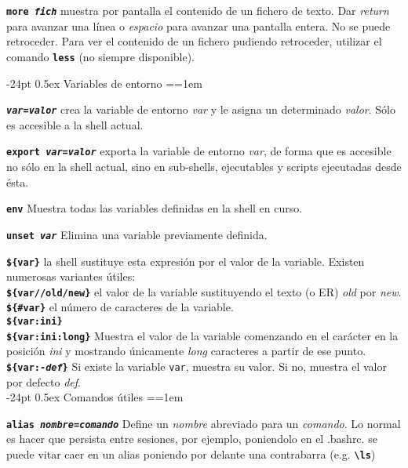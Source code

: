 \documentclass[10pt,landscape,a4paper]{article}
\makeatletter
\renewcommand\section{\@startsection{section}{1}{0mm}%
                                     {-24pt}%
                                     {0.5ex}%
                                {\normalfont\large\bfseries}}
\newcommand{\code}{\texttt}
\newcommand{\bcode}[1]{\texttt{\textbf{#1}}}
\makeatother
\begin{document}
\begin{multicols}{3}
\bcode{more \emph{fich}} muestra por pantalla el contenido de un fichero de texto. Dar \emph{return} para avanzar una línea o \emph{espacio} para avanzar una pantalla entera. No se puede retroceder. Para ver el contenido de un fichero pudiendo retroceder, utilizar el comando \bcode{less} (no siempre disponible).

\section{Variables de entorno}
\everypar={\hangindent=1em}

\bcode{\emph{var}=\emph{valor}} crea la variable de entorno \emph{var} y le asigna un determinado \emph{valor}. Sólo es accesible a la shell actual.

\bcode{export \emph{var}=\emph{valor}} exporta la variable de entorno \emph{var}, de forma que es accesible no sólo en la shell actual, sino en sub-shells, ejecutables y scripts ejecutadas desde ésta.

\bcode{env} Muestra todas las variables definidas en la shell en curso.

\bcode{unset \emph{var}} Elimina una variable previamente definida.

\bcode{\$\{var\}} la shell sustituye esta expresión por el valor de la variable. Existen numerosas variantes útiles:\\
  \bcode{\$\{var//old/new\}} el valor de la variable sustituyendo el texto (o ER) \emph{old} por \emph{new}.\\
  \bcode{\$\{\#var\}} el número de caracteres de la variable.\\
  \bcode{\$\{var:ini\}}\\
  \bcode{\$\{var:ini:long\}} Muestra el valor de la variable comenzando en el carácter en la posición \emph{ini} y mostrando únicamente \emph{long} caracteres a partir de ese punto.\\
  \bcode{\$\{var:-\emph{def}\}} Si existe la variable \code{var}, muestra su valor. Si no, muestra el valor por defecto \emph{def}.\\

\section{Comandos útiles}
\everypar={\hangindent=1em}

\bcode{alias \emph{nombre}=\emph{comando}} Define un \emph{nombre} abreviado para un \emph{comando}. Lo normal es hacer que persista entre sesiones, por ejemplo, poniendolo en el .bashrc. se puede vitar caer en un alias poniendo por delante una contrabarra (e.g. \bcode{{\textbackslash}ls})


\end{multicols}
\end{document}
